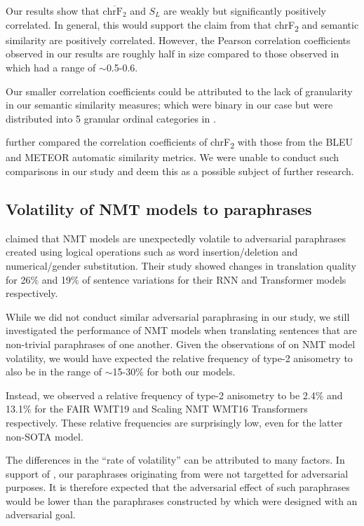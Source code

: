 \documentclass[11pt,a4paper]{article}
\begin{document}
Our results show that $\overline{\text{chrF}_2}$ and $S_L$ are weakly but significantly positively correlated. In general, this would support the claim from \citet{michel2019evaluation} that chrF\textsubscript{2} and semantic similarity are positively correlated. However, the Pearson correlation coefficients observed in our results are roughly half in size compared to those observed in \citet{michel2019evaluation} which had a range of $\sim$0.5-0.6.

Our smaller correlation coefficients could be attributed to the lack of granularity in our semantic similarity measures; which were binary in our case but were distributed into 5 granular ordinal categories in \citet{michel2019evaluation}. 

\citet{michel2019evaluation} further compared the correlation coefficients of chrF\textsubscript{2} with those from the BLEU \cite{papineni2002bleu} and METEOR \cite{denkowski2014meteor} automatic similarity metrics. We were unable to conduct such comparisons in our study and deem this as a possible subject of further research. 

\subsection{Volatility of NMT models to paraphrases}

\citet{fadaee2020unreasonable} claimed that NMT models are unexpectedly volatile to adversarial paraphrases created using logical operations such as word insertion/deletion and numerical/gender substitution. Their study showed changes in translation quality for 26$\%$ and 19$\%$ of sentence variations for their RNN and Transformer models respectively.

While we did not conduct similar adversarial paraphrasing in our study, we still investigated the performance of NMT models when translating sentences that are non-trivial paraphrases of one another. Given the observations of \citet{fadaee2020unreasonable} on NMT model volatility, we would have expected the relative frequency of type-2 anisometry to also be in the range of $\sim$15-30$\%$ for both our models.

Instead, we observed a relative frequency of type-2 anisometry to be 2.4$\%$ and 13.1$\%$ for the FAIR WMT19 and Scaling NMT WMT16 Transformers respectively. These relative frequencies are surprisingly low, even for the latter non-SOTA model.

The differences in the ``rate of volatility'' can be attributed to many factors. In support of \citet{fadaee2020unreasonable}, our paraphrases originating from \citet{freitag-bleu-paraphrase-references-2020} were not targetted for adversarial purposes. It is therefore expected that the adversarial effect of such paraphrases would be lower than the paraphrases constructed by \citet{fadaee2020unreasonable} which were designed with an adversarial goal.
\end{document}
